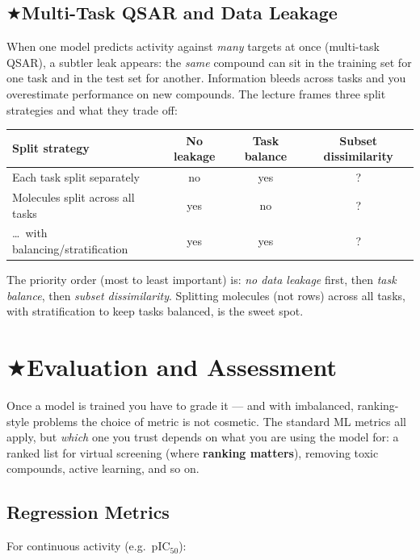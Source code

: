 \documentclass[11pt, oneside]{book}
\makeatletter
\newcommand{\starglyph}{\textcolor{stargold}{\ensuremath{\bigstar}}}
\newcommand{\starsec}[1]{%
  \texorpdfstring{\starglyph\hspace{0.4em}\textcolor{star@frame}{#1}}{#1}}
\makeatother
\begin{document}
\subsection{\starsec{Multi-Task QSAR and Data Leakage}}

When one model predicts activity against \emph{many} targets at once (multi-task
QSAR), a subtler leak appears: the \emph{same} compound can sit in the training set
for one task and in the test set for another. Information bleeds across tasks and
you overestimate performance on new compounds. The lecture frames three split
strategies and what they trade off:

\begin{center}
\small
\begin{tabular}{lccc}
\toprule
\textbf{Split strategy} & \textbf{No leakage} & \textbf{Task balance} & \textbf{Subset dissimilarity} \\
\midrule
Each task split separately            & no  & yes & ? \\
Molecules split across all tasks      & yes & no  & ? \\
\;\;\dots\ with balancing/stratification & yes & yes & ? \\
\bottomrule
\end{tabular}
\end{center}

The priority order (most to least important) is: \emph{no data leakage} first,
then \emph{task balance}, then \emph{subset dissimilarity}. Splitting molecules
(not rows) across all tasks, with stratification to keep tasks balanced, is the
sweet spot.

\section{\starsec{Evaluation and Assessment}}

Once a model is trained you have to grade it --- and with imbalanced, ranking-style
problems the choice of metric is not cosmetic. The standard ML metrics all apply,
but \emph{which} one you trust depends on what you are using the model for: a
ranked list for virtual screening (where \textbf{ranking matters}), removing toxic
compounds, active learning, and so on.

\subsection{Regression Metrics}

For continuous activity (e.g.\ pIC$_{50}$):
\end{document}
